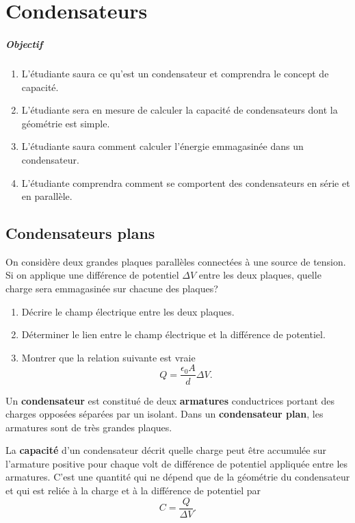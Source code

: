 \chapter{Condensateurs}

\paragraph{Objectif}

\begin{enumerate}
  \item L'étudiante saura ce qu'est un condensateur et comprendra le concept de
    capacité.
  \item L'étudiante sera en mesure de calculer la capacité de condensateurs dont
    la géométrie est simple.
  \item L'étudiante saura comment calculer l'énergie emmagasinée dans un
    condensateur.
  \item L'étudiante comprendra comment se comportent des condensateurs en série
    et en parallèle.
\end{enumerate}



\section{Condensateurs plans}


On considère deux grandes plaques parallèles connectées à une source de
tension.  Si on applique une différence de potentiel $\Delta V$ entre les deux
plaques, quelle charge sera emmagasinée sur chacune des plaques?

\begin{enumerate}
  \item Décrire le champ électrique entre les deux plaques.
  \item Déterminer le lien entre le champ électrique et la différence de
    potentiel.
  \item Montrer que la relation suivante est vraie
    $$Q = \frac{\epsilon_0 A}{d} \Delta V.$$
\end{enumerate}


Un \textbf{condensateur} est constitué de deux \textbf{armatures} conductrices
portant des charges opposées séparées par un isolant. Dans un
\textbf{condensateur plan}, les armatures sont de très grandes plaques.

La \textbf{capacité} d'un condensateur décrit quelle charge peut être accumulée
sur l'armature positive pour chaque volt de différence de potentiel appliquée
entre les armatures. C'est une quantité qui ne dépend que de la géométrie du
condensateur et qui est reliée à la charge et à la différence de potentiel par
$$C = \frac{Q}{\Delta V}.$$

